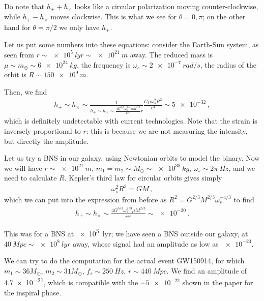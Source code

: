 \documentclass[main.tex]{subfiles}
\begin{document}
Do note that \(h_{+} + h_{ \times }\) looks like a circular polarization moving counter-clockwise, while \(h_{+} - h_{ \times }\) moves clockwise. This is what we see for \(\theta = 0, \pi \); on the other hand for \(\theta = \pi /2\) we only have \(h_{+}\). 


Let us put some numbers into these equations: consider the Earth-Sun system, as seen from \(r \sim\SI{e5}{lyr} \sim \SI{e21}{m}\) away. The reduced mass is \(\mu \sim m_{\oplus} \sim \SI{6e24}{kg}\), the frequency is \(\omega_{s} \sim \SI{2e-7}{rad/s}\), the radius of the orbit is \(R \sim \SI{150e9}{m}\).

Then, we find 
%
\begin{align}
h_+ \sim h_{ \times } \sim \frac{1}{
h_{+} \sim h_{ \times } \sim \frac{4 G^{5/3} \omega_{s}^{2/3} \mu M^{2/3}}{r c^{4}}r} \frac{G \mu \omega_{s}^2 R^2}{c^{4}} \sim \num{5e-32}
\,,
\end{align}
%
which is definitely undetectable with current technologies. 
Note that the strain is inversely proportional to \(r\): this is because we are not measuring the intensity, but directly the amplitude. 

Let us try a BNS in our galaxy, using Newtonian orbits to model the binary.
Now we will have \(r \sim \SI{e21}{m}\), \(m_1 = m_2 \sim M_{\odot} \sim \SI{e30}{kg}\), \(\omega_{s} \sim 2 \pi \SI{}{Hz}\), and we need to calculate \(R\).
Kepler's third law for circular orbits gives simply 
%
\begin{align}
\omega_{s}^2 R^3 = GM
\,,
\end{align}
%
which we can put into the expression from before as \(R^2 = G^{2/3} M^{2/3} \omega_{s}^{-4/3}\) to find 
%
\begin{align}
h_{+} \sim h_{ \times } \sim \frac{4 G^{5/3} \omega_{s}^{2/3} \mu M^{2/3}}{r c^{4}} \sim \num{e-20}
\,.
\end{align}


This was for a BNS at \SI{e5}{lyr};
we have seen a BNS outside our galaxy, at \(\SI{40}{Mpc} \sim \SI{e8}{lyr}\) away, whose signal had an amplitude as low as \(\num{e-23}\). 

We can try to do the computation for the actual event GW150914, for which \(m_1 \sim 36 M_{\odot}\), \(m_2 \sim 31 M_{\odot}\), \(f_s \sim \SI{250}{Hz}\), \(r \sim \SI{440}{Mpc}\). 
We find an amplitude of \num{4.7e-21}, which is compatible with the \(\sim \num{5e-22}\) shown in the paper \cite[fig.\ 2]{ligoscientificcollaborationandvirgocollaborationObservationGravitationalWaves2016} for the inspiral phase.
\end{document}
